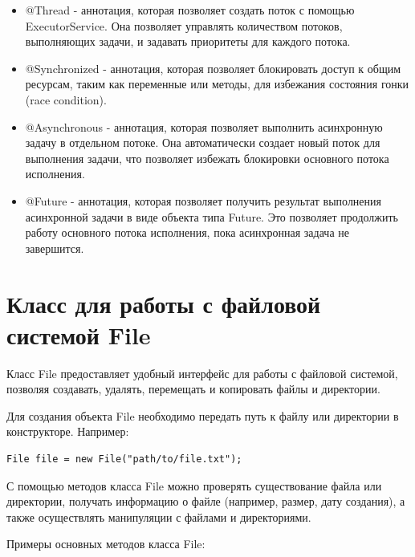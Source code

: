 \begin{itemize}
\item @Thread - аннотация, которая позволяет создать поток с помощью ExecutorService. Она позволяет управлять количеством потоков, выполняющих задачи, и задавать приоритеты для каждого потока.
\item @Synchronized - аннотация, которая позволяет блокировать доступ к общим ресурсам, таким как переменные или методы, для избежания состояния гонки (race condition).
\item @Asynchronous - аннотация, которая позволяет выполнить асинхронную задачу в отдельном потоке. Она автоматически создает новый поток для выполнения задачи, что позволяет избежать блокировки основного потока исполнения.
\item @Future - аннотация, которая позволяет получить результат выполнения асинхронной задачи в виде объекта типа Future. Это позволяет продолжить работу основного потока исполнения, пока асинхронная задача не завершится.
\end{itemize}

\section{Класс для работы с файловой системой File}

Класс File предоставляет удобный интерфейс для работы с файловой системой, позволяя создавать, удалять, перемещать и копировать файлы и директории.

Для создания объекта File необходимо передать путь к файлу или директории в конструкторе. Например:

\begin{lstlisting}
File file = new File("path/to/file.txt");
\end{lstlisting}

С помощью методов класса File можно проверять существование файла или директории, получать информацию о файле (например, размер, дату создания), а также осуществлять манипуляции с файлами и директориями.

Примеры основных методов класса File:

